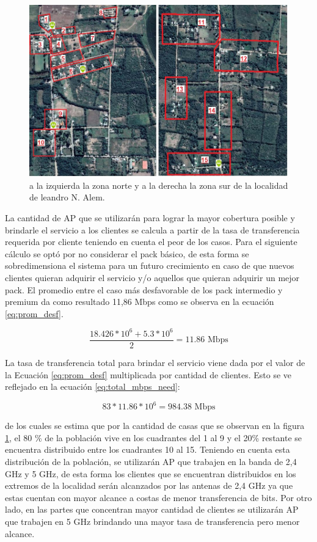 \documentclass[11pt,a4paper]{article}
\begin{document}
\begin{figure}[htbp]
  \centering
  \includegraphics[width=\linewidth]{fotos_ema/cuadrantes_alem.jpg}
  \caption{a la izquierda la zona norte y a la derecha la zona sur de la localidad de leandro N. Alem.}
  \label{fig:cuadrantes_alem}
\end{figure}

La cantidad de AP que se utilizarán para lograr la mayor cobertura posible y brindarle el servicio a los clientes se calcula a partir de la tasa de transferencia requerida por cliente teniendo en cuenta el peor de los casos.
Para el siguiente cálculo se optó por no considerar el pack básico, de esta forma se sobredimensiona el sistema para un futuro crecimiento en caso de que nuevos clientes quieran adquirir el servicio y/o aquellos que quieran adquirir un mejor pack. 
El promedio entre el caso más desfavorable de los pack intermedio y premium da como resultado 11,86 Mbps como se observa en la ecuación \ref{eq:prom_desf}. 

\begin{equation}
  \frac{18.426*{10}^6+5.3*{10}^6}{2}=11.86 \text{ Mbps}
  \label{eq:prom_desf}
\end{equation}

La tasa de transferencia total para brindar el servicio viene dada por el valor de la Ecuación \ref{eq:prom_desf} multiplicada por cantidad de clientes. Esto se ve reflejado en la ecuación \ref{eq:total_mbps_need}:

\begin{equation}
  83 * 11.86*{10}^6 = 984.38 \text{ Mbps}
  \label{eq:total_mbps_need}
\end{equation}

de los cuales se estima que por la cantidad de casas que se observan en la figura \ref{fig:cuadrantes_alem}, el 80 \% de la población vive en los cuadrantes del 1 al 9 y el 20\% restante se encuentra distribuido entre los cuadrantes 10 al 15. 
Teniendo en cuenta esta distribución de la población, se utilizarán AP que trabajen en la banda de 2,4 GHz y 5 GHz, de esta forma los clientes que se encuentran distribuidos en los extremos de la localidad serán alcanzados por las antenas de 2,4 GHz ya que estas cuentan con mayor alcance a costas de menor transferencia de bits. 
Por otro lado, en las partes que concentran mayor cantidad de clientes se utilizarán AP que trabajen en 5 GHz brindando una mayor tasa de transferencia pero menor alcance.
\end{document}
